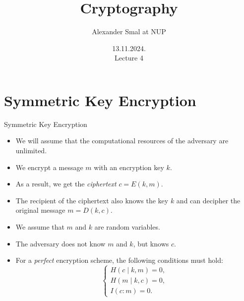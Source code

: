 \documentclass[
handout,
aspectratio=169]{beamer}
\title{Cryptography}
\author{Alexander Smal at NUP}
\date{13.11.2024.\\ Lecture 4}
\newcommand{\pitem}{\pause\item}
\begin{document}
\begin{frame}[plain]
    \maketitle
\end{frame}

\section{Symmetric Key Encryption}
\begin{frame}{Symmetric Key Encryption}
    \begin{itemize}
        \item
    We will assume that the computational resources of the adversary are unlimited.

        \pitem
    We encrypt a message $m$ with an encryption key $k$.

        \pitem As a result, we get the \emph{ciphertext} $c = E(k, m)$.


        \pitem The recipient of the ciphertext also knows the key $k$ and can decipher the original message $m = D(k, c)$.

        \pitem We assume that $m$ and $k$ are random variables.

        \pitem The adversary does not know $m$ and $k$, but knows $c$.

        \pitem For a \emph{perfect} encryption scheme, the following conditions must hold:
        \[
        \begin{cases}
            H(c \mid k, m) = 0,\\
            H(m \mid k, c) = 0,\\
            I(c : m) = 0.
        \end{cases}
        \]

    \end{itemize}

\end{frame}
\end{document}
